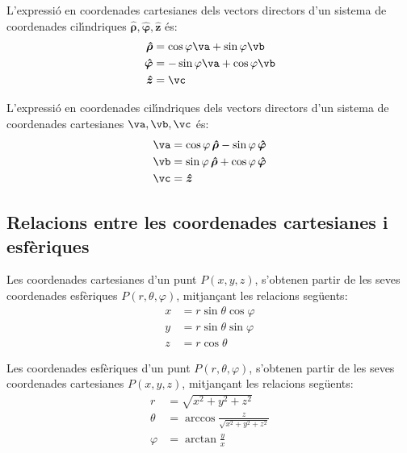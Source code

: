 \documentclass[catalan,a4paper,twoside,11pt]{article}
\begin{document}
L'expressi\'{o} en coordenades cartesianes dels vectors directors d'un sistema de coordenades  cil\'{\i}ndriques $\boldsymbol{\hat{\rho}},\boldsymbol{\hat{\varphi}},\boldsymbol{\hat{z}}$ \'{e}s:
\begin{subequations}\begin{align}
    \boldsymbol{\hat{\rho}} &=\cos\varphi\va+\sin\varphi\vb \\
    \boldsymbol{\hat{\varphi}} &=-\sin\varphi\va+\cos\varphi\vb \\
    \boldsymbol{\hat{z}} &=\vc
\end{align}\end{subequations}

L'expressi\'{o} en coordenades cil\'{\i}ndriques dels vectors directors d'un sistema de coordenades  cartesianes $\va,\vb,\vc$ \'{e}s:
\begin{subequations}\begin{align}
    \va &=\cos\varphi\,\boldsymbol{\hat{\rho}}-\sin\varphi\,\boldsymbol{\hat{\varphi}} \\
    \vb &=\sin\varphi\,\boldsymbol{\hat{\rho}}+\cos\varphi\,\boldsymbol{\hat{\varphi}} \\
    \vc &=\boldsymbol{\hat{z}}
\end{align}\end{subequations}

\subsection{Relacions entre les coordenades cartesianes i
esf\`{e}riques}

Les coordenades cartesianes  d'un punt $P(x,y,z)$, s'obtenen partir
de les seves coordenades esf\`{e}riques $P(r,\theta,\varphi)$,
mitjan\c{c}ant les relacions seg\"{u}ents:
\begin{subequations}\begin{align}
    x &=r\sin\theta\cos\varphi \\ y &=r\sin\theta\sin\varphi \\ z &=r\cos\theta
\end{align}\end{subequations}

Les coordenades  esf\`{e}riques  d'un punt $P(r,\theta,\varphi)$,
s'obtenen partir de les seves coordenades cartesianes $P(x,y,z)$,
mitjan\c{c}ant les relacions seg\"{u}ents:
\begin{subequations}\begin{align}
    r &=\sqrt{x^2+y^2+z^2}\\
    \theta&=\arccos\frac{z}{\sqrt{x^2+y^2+z^2}}\\
    \varphi &=\arctan\frac{y}{x}
\end{align}\end{subequations}
\end{document}
